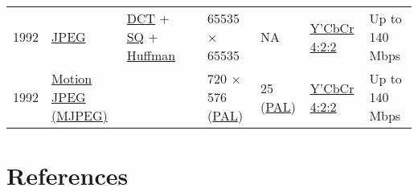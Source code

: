 \begin{tabular}{rlllllll}
1992 & %
\href{https://en.wikipedia.org/wiki/JPEG}{JPEG} & %
\href{https://en.wikipedia.org/wiki/Discrete_cosine_transform}{DCT} + \href{https://en.wikipedia.org/wiki/Quantization_(signal_processing}{SQ} + \href{https://en.wikipedia.org/wiki/Quantization_(signal_processing}{Huffman} & %
\href{}{} & %
65535 × 65535 & %
NA & %
\href{https://en.wikipedia.org/wiki/Chroma_subsampling#4:2:2}{Y'CbCr 4:2:2} & %
Up to 140 Mbps\\

1992 & %
\href{https://en.wikipedia.org/wiki/Motion_JPEG}{Motion JPEG (MJPEG)} & %
\href{}{} & %
\href{}{} & %
720 × 576 (\href{https://en.wikipedia.org/wiki/PAL}{PAL}) & %
25 (\href{https://en.wikipedia.org/wiki/PAL}{PAL}) & %
\href{https://en.wikipedia.org/wiki/Chroma_subsampling#4:2:2}{Y'CbCr 4:2:2} & %
Up to 140 Mbps\\

\end{tabular}

\section{References}

\renewcommand{\addcontentsline}[3]{}%

